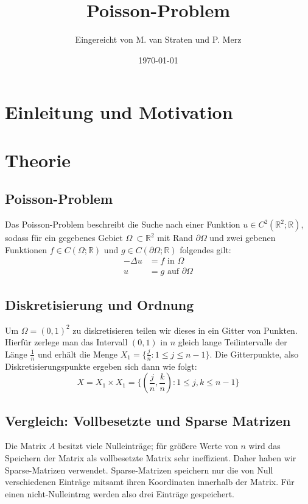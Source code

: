 \documentclass{scrartcl}
\title{Poisson-Problem}
\author{%
  Eingereicht von M. van Straten und P. Merz
}
\date{\today}
\theoremstyle{remark}
\begin{document}
\maketitle
\tableofcontents
\cleardoublepage


\section{Einleitung und Motivation}



\section{Theorie}
\subsection{Poisson-Problem} 
Das Poisson-Problem beschreibt die Suche nach einer Funktion \(u \in C^{2}(\mathbb{R}^{2};\mathbb{R})\), sodass für ein gegebenes Gebiet
\(\Omega\ \subset \mathbb{R}^{2}\) mit Rand \(\partial \Omega\) und zwei gebenen Funktionen \(f \in C(\Omega;\mathbb{R})\) und
\(g \in C(\partial \Omega;\mathbb{R})\) folgendes gilt:
\begin{align*}
-\Delta u &= f \text{       in } \Omega  \\
        u &= g \text{       auf } \partial \Omega
\end{align*}


\subsection{Diskretisierung und Ordnung}
Um \(\Omega = (0,1)^{2}\) zu diskretisieren teilen wir dieses in ein Gitter von Punkten.
Hierfür zerlege man das Intervall \((0,1)\) in \(n\) gleich lange Teilintervalle der Länge \(\frac{1}{n}\)
und erhält die Menge \(X_{1} = \{\frac{j}{n}: 1 \leqslant j \leqslant n - 1\} \).
Die Gitterpunkte, also Diskretisierungspunkte ergeben sich dann wie folgt:
\[X = X_{1} \times X_{1} = \{(\frac{j}{n}, \frac{k}{n}): 1 \leqslant j,k \leqslant n - 1\} \]




\subsection{Vergleich: Vollbesetzte und Sparse Matrizen}
Die Matrix \(A\) besitzt viele Nulleinträge; für größere Werte von \(n\) wird das Speichern
der Matrix als vollbesetzte Matrix sehr ineffizient. Daher haben wir Sparse-Matrizen verwendet.
Sparse-Matrizen speichern nur die von Null verschiedenen Einträge mitsamt ihren Koordinaten innerhalb 
der Matrix. Für einen nicht-Nulleintrag werden also drei Einträge gespeichert.  
\end{document}
